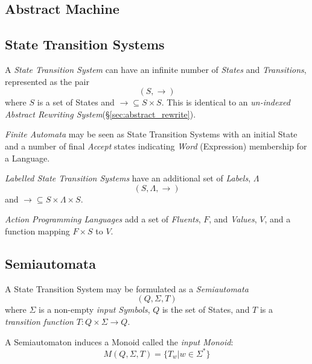 \subsection{Abstract Machine} \label{sec:abstract_machine}

\subsection{State Transition Systems} \label{sec:state_transition_system}

A \emph{State Transition System} can have an infinite number of
\emph{States} and \emph{Transitions}, represented as the pair
\[
    (S,\rightarrow)
\]
where $S$ is a set of States and $\rightarrow \subseteq S \times S$.
This is identical to an \emph{un-indexed Abstract Rewriting
  System}(\S\ref{sec:abstract_rewrite}).

\emph{Finite Automata} may be seen as State Transition Systems with an
initial State and a number of final \emph{Accept} states indicating
\emph{Word} (Expression) membership for a Language.

\emph{Labelled State Transition Systems} have an additional set of
\emph{Labels}, $\Lambda$
\[(S,\Lambda,\rightarrow)\]
and $\rightarrow \subseteq S \times \Lambda \times S$.

\emph{Action Programming Languages} add a set of \emph{Fluents}, $F$, and
\emph{Values}, $V$, and a function mapping $F \times S$ to $V$.



\subsection{Semiautomata}\label{sec:semiautomata}

A State Transition System may be formulated as a \emph{Semiautomata}
\[
    (Q,\Sigma,T)
\]
where $\Sigma$ is a non-empty \emph{input Symbols}, $Q$ is the set of
States, and $T$ is a \emph{transition function} $T:Q \times \Sigma
\rightarrow Q$.

A Semiautomaton induces a Monoid called the \emph{input Monoid}:
\[
    M(Q,\Sigma,T) = \{T_w | w \in \Sigma^*\}
\]



